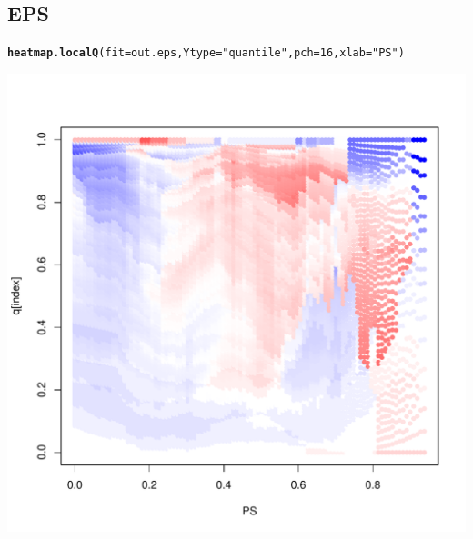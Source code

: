 \documentclass{article}\usepackage[]{graphicx}\usepackage[]{color}
\makeatletter
\def\maxwidth{ %
  \ifdim\Gin@nat@width>\linewidth
    \linewidth
  \else
    \Gin@nat@width
  \fi
}
\newcommand{\hlnum}[1]{\textcolor[rgb]{0.686,0.059,0.569}{#1}}%
\newcommand{\hlstr}[1]{\textcolor[rgb]{0.192,0.494,0.8}{#1}}%
\newcommand{\hlstd}[1]{\textcolor[rgb]{0.345,0.345,0.345}{#1}}%
\newcommand{\hlkwc}[1]{\textcolor[rgb]{0.333,0.667,0.333}{#1}}%
\newcommand{\hlkwd}[1]{\textcolor[rgb]{0.737,0.353,0.396}{\textbf{#1}}}%
\newenvironment{kframe}{%
 \def\at@end@of@kframe{}%
 \ifinner\ifhmode%
  \def\at@end@of@kframe{\end{minipage}}%
  \begin{minipage}{\columnwidth}%
 \fi\fi%
 \def\FrameCommand##1{\hskip\@totalleftmargin \hskip-\fboxsep
 \colorbox{shadecolor}{##1}\hskip-\fboxsep
     \hskip-\linewidth \hskip-\@totalleftmargin \hskip\columnwidth}%
 \MakeFramed {\advance\hsize-\width
   \@totalleftmargin\z@ \linewidth\hsize
   \@setminipage}}%
 {\par\unskip\endMakeFramed%
 \at@end@of@kframe}
\newenvironment{knitrout}{}{} %
\makeatother
\begin{document}
\subsection{EPS}
\begin{knitrout}
\color{fgcolor}\begin{kframe}
\begin{alltt}
\hlkwd{heatmap.localQ}\hlstd{(}\hlkwc{fit}\hlstd{=out.eps ,} \hlkwc{Ytype}\hlstd{=}\hlstr{"quantile"} \hlstd{,} \hlkwc{pch}\hlstd{=}\hlnum{16} \hlstd{,} \hlkwc{xlab}\hlstd{=}\hlstr{"PS"}\hlstd{)}
\end{alltt}
\end{kframe}

{\centering \includegraphics[width=\maxwidth]{figures/EPS-heatmap-1} 

}



\end{knitrout}
\end{document}
